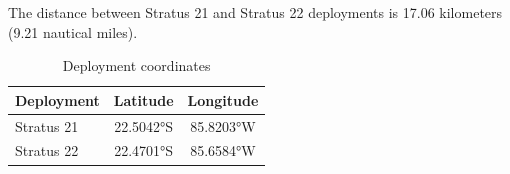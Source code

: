 
The distance between Stratus 21 and Stratus 22 deployments is 17.06 kilometers (9.21 nautical miles).

\begin{table}[ht]
\centering
\caption{Deployment coordinates}
\begin{tabular}{lcc}
\hline
\textbf{Deployment} & \textbf{Latitude} & \textbf{Longitude} \\
\hline
Stratus 21 & 22.5042°S & 85.8203°W \\
Stratus 22 & 22.4701°S & 85.6584°W \\
\hline
\end{tabular}
\end{table}
